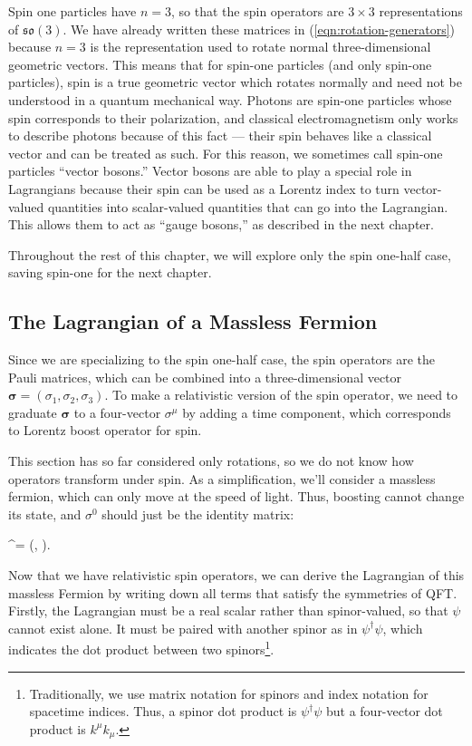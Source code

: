 Spin one particles have $n=3$, so that the spin operators are $3\times 3$ representations of $\mathfrak{so}(3)$. We have already written these matrices in (\ref{eqn:rotation-generators}) because $n=3$ is the representation used to rotate normal three-dimensional geometric vectors. This means that for spin-one particles (and only spin-one particles), spin is a true geometric vector which rotates normally and need not be understood in a quantum mechanical way. Photons are spin-one particles whose spin corresponds to their polarization, and classical electromagnetism only works to describe photons because of this fact --- their spin behaves like a classical vector and can be treated as such. For this reason, we sometimes call spin-one particles ``vector bosons.'' Vector bosons are able to play a special role in Lagrangians because their spin can be used as a Lorentz index to turn vector-valued quantities into scalar-valued quantities that can go into the Lagrangian. This allows them to act as ``gauge bosons,'' as described in the next chapter.

Throughout the rest of this chapter, we will explore only the spin one-half case, saving spin-one for the next chapter.

\subsection{The Lagrangian of a Massless Fermion}

Since we are specializing to the spin one-half case, the spin operators are the Pauli matrices, which can be combined into a three-dimensional vector $\bm \sigma = (\sigma_1, \sigma_2, \sigma_3)$. To make a relativistic version of the spin operator, we need to graduate $\bm \sigma$ to a four-vector $\sigma^\mu$ by adding a time component, which corresponds to Lorentz boost operator for spin.

This section has so far considered only rotations, so we do not know how operators transform under spin. As a simplification, we'll consider a massless fermion, which can only move at the speed of light. Thus, boosting cannot change its state, and $\sigma^0$ should just be the identity matrix:
\begin{e}
  \sigma^\mu = (, \bm \sigma).
\end{e}

Now that we have relativistic spin operators, we can derive the Lagrangian of this massless Fermion by writing down all terms that satisfy the symmetries of QFT. Firstly, the Lagrangian must be a real scalar rather than spinor-valued, so that $\psi$ cannot exist alone. It must be paired with another spinor as in $\psi^\dagger \psi$, which indicates the dot product between two spinors\footnote{Traditionally, we use matrix notation for spinors and index notation for spacetime indices. Thus, a spinor dot product is $\psi^\dagger \psi$ but a four-vector dot product is $k^\mu k_\mu$.}.

